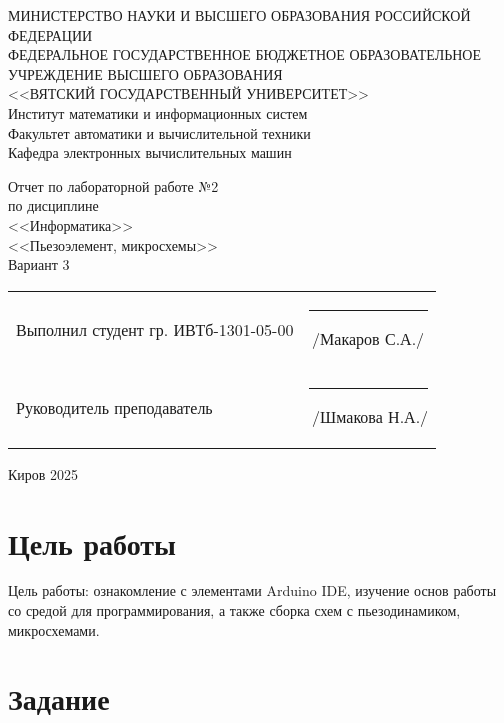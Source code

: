 \documentclass[a4paper,14pt]{extarticle}
\begin{document}
  \newpage\thispagestyle{empty}
  \begin{center}
    \MakeUppercase{
      Министерство науки и высшего образования Российской Федерации\\
      Федеральное государственное бюджетное образовательное учреждение высшего образования\\
      <<Вятский Государственный Университет>>\\
    }
    Институт математики и информационных систем\\
    Факультет автоматики и вычислительной техники\\
    Кафедра электронных вычислительных машин
  \end{center}
  \vfill

  \begin{center}
    Отчет по лабораторной работе №2\\
    по дисциплине\\
    <<Информатика>>\\
    <<Пьезоэлемент, микросхемы>>\\
    Вариант 3
  \end{center}
  \vfill

  \noindent
  \begin{tabular}{ll}
    Выполнил студент гр. ИВТб-1301-05-00 \hspace{5mm} &
    \rule[-1mm]{25mm}{0.10mm}\,/Макаров С.А./                                                     \\

    Руководитель преподаватель                        & \rule[-1mm]{25mm}{0.10mm}\,/Шмакова Н.А./ \\
  \end{tabular}

  \vfill
  \begin{center}
    Киров 2025
  \end{center}

  \newpage
  \section*{\hspace{12.5mm}Цель работы}
  Цель работы: ознакомление с элементами Arduino IDE, изучение
  основ работы со средой для программирования, а также сборка схем с
  пьезодинамиком, микросхемами.

  \section*{\hspace{12.5mm}Задание}
\end{document}
